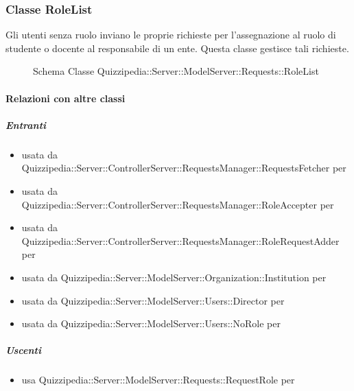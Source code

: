 \subsubsection{Classe RoleList}
Gli utenti senza ruolo inviano le proprie richieste per l'assegnazione al ruolo di studente o docente al responsabile di un ente. Questa classe gestisce tali richieste.
\begin{figure}[H]
\centering
\noindent{}
\caption[Schema Classe RoleList]{Schema Classe Quizzipedia::Server::ModelServer::Requests::RoleList}
\end{figure}
\paragraph{Relazioni con altre classi}
\subparagraph{Entranti}
\begin{itemize}
\item usata da Quizzipedia::Server::ControllerServer::RequestsManager::RequestsFetcher per 
\item usata da Quizzipedia::Server::ControllerServer::RequestsManager::RoleAccepter per 
\item usata da Quizzipedia::Server::ControllerServer::RequestsManager::RoleRequestAdder per 
\item usata da Quizzipedia::Server::ModelServer::Organization::Institution per 
\item usata da Quizzipedia::Server::ModelServer::Users::Director per 
\item usata da Quizzipedia::Server::ModelServer::Users::NoRole per 
\end{itemize}
\subparagraph{Uscenti}
\begin{itemize}
\item usa Quizzipedia::Server::ModelServer::Requests::RequestRole per 
\end{itemize}
